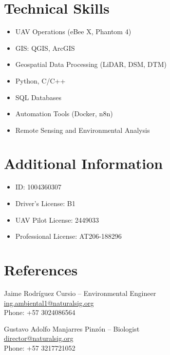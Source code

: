 \documentclass[10pt,a4paper]{article}
\begin{document}
\vspace{3mm}

\section*{Technical Skills}

\begin{itemize}[noitemsep]
    \item UAV Operations (eBee X, Phantom 4)
    \item GIS: QGIS, ArcGIS
    \item Geospatial Data Processing (LiDAR, DSM, DTM)
    \item Python, C/C++
    \item SQL Databases
    \item Automation Tools (Docker, n8n)
    \item Remote Sensing and Environmental Analysis
\end{itemize}

\vspace{3mm}

\section*{Additional Information}

\begin{itemize}[noitemsep]
    \item ID: 1004360307
    \item Driver’s License: B1
    \item UAV Pilot License: 2449033
    \item Professional License: AT206-188296
\end{itemize}

\vspace{3mm}

\section*{References}

Jaime Rodríguez Cursio -- Environmental Engineer \\
\href{mailto:ing.ambiental1@naturalsig.org}{ing.ambiental1@naturalsig.org} \\
Phone: +57 3024086564

\vspace{2mm}

Gustavo Adolfo Manjarres Pinzón -- Biologist \\
\href{mailto:director@naturalsig.org}{director@naturalsig.org} \\
Phone: +57 3217721052
\end{document}
